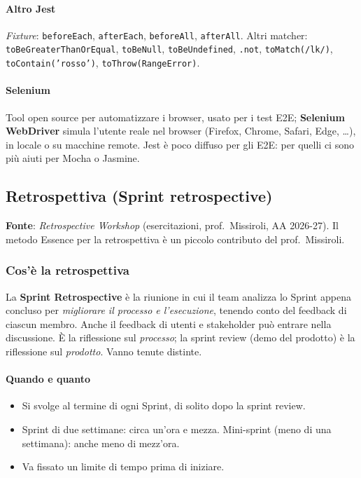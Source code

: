 \documentclass[a4paper,12pt]{article}
\begin{document}
\paragraph{Altro Jest} \emph{Fixture}: \texttt{beforeEach}, \texttt{afterEach},
\texttt{beforeAll}, \texttt{afterAll}. Altri matcher: \texttt{toBeGreaterThanOrEqual},
\texttt{toBeNull}, \texttt{toBeUndefined}, \texttt{.not}, \texttt{toMatch(/lk/)},
\texttt{toContain('rosso')}, \texttt{toThrow(RangeError)}.

\paragraph{Selenium} Tool open source per automatizzare i browser, usato per i test E2E;
\textbf{Selenium WebDriver} simula l'utente reale nel browser (Firefox, Chrome, Safari,
Edge, \dots), in locale o su macchine remote. Jest è poco diffuso per gli E2E: per quelli ci sono più
aiuti per Mocha o Jasmine.

\subsection{Retrospettiva (Sprint retrospective)}


\textbf{Fonte}: \emph{Retrospective Workshop} (esercitazioni, prof.\ Missiroli, AA 2026-27).
Il metodo Essence per la retrospettiva è un piccolo contributo del prof.\ Missiroli.

\subsubsection{Cos'è la retrospettiva}
La \textbf{Sprint Retrospective} è la riunione in cui il team analizza lo Sprint appena
concluso per \emph{migliorare il processo e l'esecuzione}, tenendo conto del feedback di
ciascun membro. Anche il feedback di utenti e stakeholder può entrare nella discussione.
È la riflessione sul \emph{processo}; la sprint review (demo del prodotto) è la riflessione
sul \emph{prodotto}. Vanno tenute distinte.

\paragraph{Quando e quanto}
\begin{itemize}[nosep]
  \item Si svolge al termine di ogni Sprint, di solito dopo la sprint review.
  \item Sprint di due settimane: circa un'ora e mezza. Mini-sprint (meno di una settimana):
        anche meno di mezz'ora.
  \item Va fissato un limite di tempo prima di iniziare.
\end{itemize}
\end{document}
